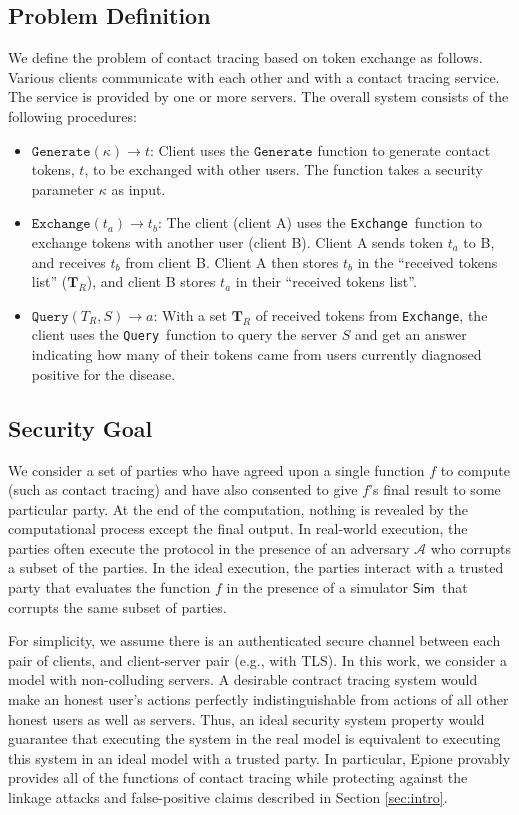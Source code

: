 \documentclass[11pt]{article} %
\newcommand{\dect}{\textsf{Epione}\xspace}
\newcommand{\ctgenerate}{\texttt{Generate}}
\newcommand{\ctexchange}{\texttt{Exchange}}
\newcommand{\ctquery}{\texttt{Query}}
\newcommand{\adv}{\ensuremath{\mathcal{A}} }
\newcommand{\sT}{\mathbf{T}}
\def\Sim{\ensuremath{\mathsf{Sim}}}
\renewcommand\to{\ensuremath{\rightarrow}}
\begin{document}
\subsection{Problem Definition}
\label{subs:probl}
We define the problem of contact tracing based on token exchange as follows. Various clients communicate with each other and with a contact tracing service. The service is provided by one or more servers. The overall system consists of the following procedures:
\begin{itemize} 
	\item $\ctgenerate(\kappa) \to t$: Client uses the $\ctgenerate$ function to generate contact tokens, $t$, to be exchanged with other users.  The function takes a security parameter $\kappa$ as input.
	
	\item $\ctexchange(t_a) \to t_b$: The client (client A) uses the \ctexchange\ function to exchange tokens with another user (client B). Client A sends token $t_a$ to B, and receives $t_b$ from client B. Client A then stores $t_b$ in the ``received tokens list'' ($\sT_R$), and client B stores $t_a$ in their ``received tokens list''.
	
	\item $\ctquery(T_R, S) \to a$: With a set $\sT_R$ of received tokens from \ctexchange, the client uses the \ctquery\ function to query the server $S$ and get an answer indicating how many of their tokens came from users currently diagnosed positive for the disease.
	
\end{itemize}

\subsection{Security Goal} 
\label{subs:secure_def}
We consider a set of parties who have agreed upon a single function $f$ to compute (such as contact tracing) and have also consented to give $f$'s final result to some particular party. At the end of the computation, nothing is revealed by the computational process except the final output. In real-world execution, the parties often execute the protocol in the presence of an adversary \adv who corrupts a subset of the parties. In the ideal execution, the parties interact with a trusted party that evaluates the function $f$ in the presence of a simulator \Sim ~that corrupts the same subset of parties. 
 
For simplicity, we assume there is an authenticated secure channel between each pair of clients, and client-server pair (e.g., with TLS).  In this work, we consider a model with non-colluding servers. A desirable contract tracing system would make an honest user's actions perfectly indistinguishable from actions of all other honest users as well as servers. Thus, an ideal security system property would guarantee that executing the system in the real model is equivalent to executing this system in an ideal model with a trusted party. In particular, \dect provably provides all of the functions of contact tracing while protecting against the linkage attacks and false-positive claims described in Section \ref{sec:intro}.
\end{document}
